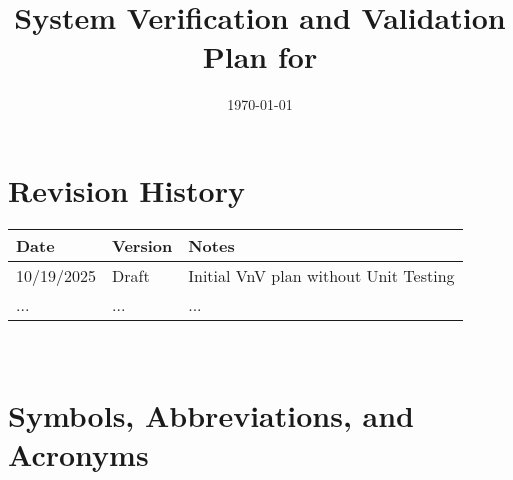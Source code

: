 \documentclass[12pt, titlepage]{article}
\begin{document}
\title{System Verification and Validation Plan for \progname{}} 
\author{\authname}
\date{\today}
	
\maketitle


\section*{Revision History}

\begin{tabularx}{\textwidth}{p{3cm}p{2cm}X}
\toprule {\bf Date} & {\bf Version} & {\bf Notes}\\
\midrule
10/19/2025 & Draft & Initial VnV plan without Unit Testing\\
... & ... & ...\\
\bottomrule
\end{tabularx}

~\\

\newpage

\tableofcontents

\listoftables




\newpage



\hypertarget{glossary-catan}{}
\hypertarget{glossary-ai}{}
\hypertarget{glossary-rl}{}
\hypertarget{glossary-dt}{}
\hypertarget{glossary-cv}{}
\hypertarget{glossary-llm}{}
\hypertarget{glossary-gamestate}{}
\hypertarget{glossary-nfr}{}
\hypertarget{glossary-fr}{}

\newcommand{\Catan}{\hyperlink{glossary-catan}{Catan}}
\newcommand{\AI}{\hyperlink{glossary-ai}{AI}}
\newcommand{\RL}{\hyperlink{glossary-rl}{RL}}
\newcommand{\DigitalTwin}{\hyperlink{glossary-dt}{Digital Twin}}
\newcommand{\CV}{\hyperlink{glossary-cv}{CV}}
\newcommand{\LLM}{\hyperlink{glossary-llm}{LLM}}
\newcommand{\GameState}{\hyperlink{glossary-gamestate}{Game State}}
\newcommand{\NFR}{\hyperlink{glossary-nfr}{NFR}}
\newcommand{\FR}{\hyperlink{glossary-fr}{FR}}

\section{Symbols, Abbreviations, and Acronyms}
\end{document}

